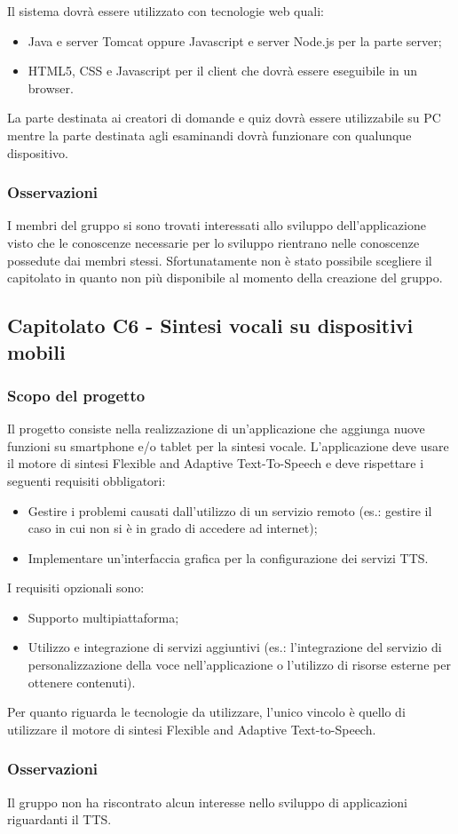 Il sistema dovrà essere utilizzato con tecnologie web quali:
\begin{itemize}
	\item Java e server Tomcat oppure Javascript e server Node.js per la parte server;
	\item HTML5, CSS e Javascript per il client che dovrà essere eseguibile in un browser.
\end{itemize}
La parte destinata ai creatori di domande e quiz dovrà essere utilizzabile su PC mentre la parte destinata agli esaminandi
dovrà funzionare con qualunque dispositivo.

\subsubsection{Osservazioni}
I membri del gruppo si sono trovati interessati allo sviluppo dell'applicazione visto che le conoscenze necessarie per lo sviluppo rientrano
nelle conoscenze possedute dai membri stessi. Sfortunatamente non è stato possibile scegliere il capitolato in quanto non più disponibile al momento
della creazione del gruppo.

\subsection{Capitolato C6 - Sintesi vocali su dispositivi mobili}
\subsubsection{Scopo del progetto}
Il progetto consiste nella realizzazione di un'applicazione che aggiunga nuove funzioni su smartphone e/o tablet per la sintesi vocale.
L'applicazione deve usare il motore di sintesi Flexible and Adaptive Text-To-Speech e deve rispettare i seguenti requisiti obbligatori:

\begin{itemize}
	\item Gestire i problemi causati dall'utilizzo di un servizio remoto (es.: gestire il caso in cui non si è in grado di accedere ad internet);
	\item Implementare un'interfaccia grafica per la configurazione dei servizi TTS.
\end{itemize}

I requisiti opzionali sono:

\begin{itemize}
	\item Supporto multipiattaforma;
	\item Utilizzo e integrazione di servizi aggiuntivi (es.: l'integrazione del servizio di personalizzazione
	della voce nell'applicazione o l'utilizzo di risorse esterne per ottenere contenuti).
\end{itemize}

Per quanto riguarda le tecnologie da utilizzare, l'unico vincolo è quello di utilizzare il motore di sintesi Flexible and Adaptive Text-to-Speech.

\subsubsection{Osservazioni}
Il gruppo non ha riscontrato alcun interesse nello sviluppo di applicazioni riguardanti il TTS.
